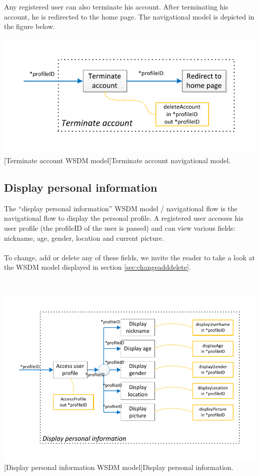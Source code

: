 \documentclass[11pt, a4paper,svglistings,oneside]{book}
\begin{document}
Any registered user can also terminate his account. After terminating his account, he is redirected to the home page. The navigational model is depicted in the figure below.
$\;$ \\
\noindent\begin{minipage}{\textwidth}
    \centering
   \includegraphics[scale=1]{nav_TerminateAccount.pdf}
 [Terminate account WSDM model]{Terminate account navigational model.}
\end{minipage}


\subsection{Display personal information}

The ``display personal information'' WSDM model / navigational flow is the navigational flow to display the personal profile. A registered user accesses his user profile (the profileID of the user is passed) and can view various fields: nickname, age, gender, location and current picture. \\ \\
To change, add or delete any of these fields, we invite the reader to take a look at the WSDM model displayed in section \ref{sec:changeadddelete}.

$\;$ \\
\noindent\begin{minipage}{\textwidth}
    \centering
   \includegraphics[scale=1]{Nav_DisplayPersonalInformation.pdf}
 [Display personal information WSDM model]{Display personal information.}
\end{minipage}
\end{document}
